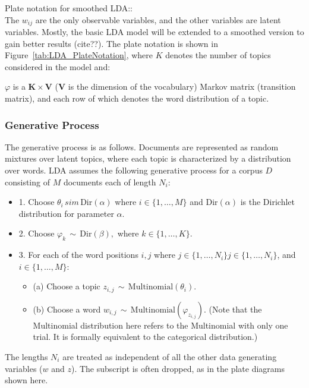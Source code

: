 \documentclass[11pt,a4paper]{article}
\begin{document}
Plate notation for smoothed LDA::\\
The $w_{ij}$ are the only observable variables, and the other variables are latent variables. Mostly, the basic LDA model will be extended to a smoothed version to gain better results (cite??). The plate notation is shown in Figure~\ref{tab:LDA_PlateNotation}, where $K$ denotes the number of topics considered in the model and:

$\varphi$ is a $\mathbf{K} \times \mathbf{V}$ ($\mathbf{V}$ is the dimension of the vocabulary) Markov matrix (transition matrix), and each row of which denotes the word distribution of a topic.


\subsubsection{Generative Process}
The generative process is as follows. Documents are represented as
random mixtures over latent topics, where each topic is characterized
by a distribution over words. LDA assumes the following generative
process for a corpus $D$ consisting of $M$ documents each of
length $N_{i}$:

\begin{itemize}
\item{1. Choose $\theta _{i}\,   sim \,\mathrm{Dir} (\alpha)$    where $i\in \{1,\dots ,M\}$ and $\mathrm{Dir}(\alpha)$ is the Dirichlet distribution for parameter $\alpha$.}
\item{2. Choose $\varphi _{k}\,\sim \,\mathrm {Dir} (\beta ),$  where $k\in \{1,\dots ,K\}$}.
\item{3. For each of the word positions $i,j$ where 
$j\in \{1,\dots ,N_{i}\} j\in \{1,\dots ,N_{i}\}$, and 
$i\in \{1,\dots ,M\}$:
}
\begin{itemize}
       \item{ (a) Choose a topic $z_{i,j}\,\sim \,\mathrm{Multinomial} (\theta _{i})$.} 
       \item{ (b) Choose a word $w_{i,j}\,\sim \,\mathrm{Multinomial} (\varphi _{z_{i,j}})$.}
         (Note that the Multinomial distribution here refers to the Multinomial with only one trial. It is formally equivalent to the categorical distribution.)
\end{itemize}
\end{itemize}
The lengths $N_{i}$ are treated as independent of all the other data
generating variables ($w$ and $z$). The subscript is often dropped, as
in the plate diagrams shown here.


 
\end{document}
